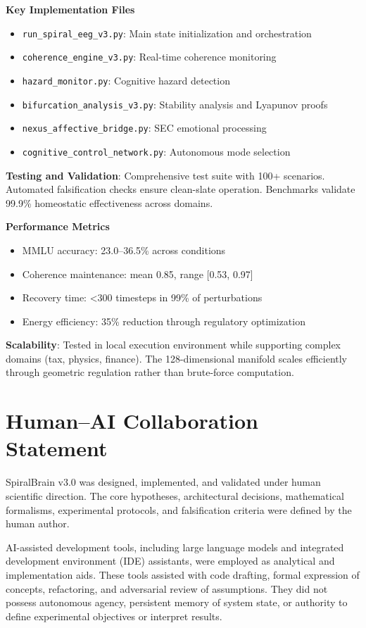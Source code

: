 \documentclass[12pt,a4paper]{report}
\begin{document}
\textbf{Key Implementation Files}

\begin{itemize}
    \item \texttt{run\_spiral\_eeg\_v3.py}: Main state initialization and orchestration
    \item \texttt{coherence\_engine\_v3.py}: Real-time coherence monitoring
    \item \texttt{hazard\_monitor.py}: Cognitive hazard detection
    \item \texttt{bifurcation\_analysis\_v3.py}: Stability analysis and Lyapunov proofs
    \item \texttt{nexus\_affective\_bridge.py}: SEC emotional processing
    \item \texttt{cognitive\_control\_network.py}: Autonomous mode selection
\end{itemize}


\textbf{Testing and Validation}: Comprehensive test suite with 100+ scenarios. Automated falsification checks ensure clean-slate operation. Benchmarks validate 99.9\% homeostatic effectiveness across domains.

\textbf{Performance Metrics}
\begin{itemize}
    \item MMLU accuracy: 23.0–36.5\% across conditions
    \item Coherence maintenance: mean 0.85, range [0.53, 0.97]
    \item Recovery time: <300 timesteps in 99\% of perturbations
    \item Energy efficiency: 35\% reduction through regulatory optimization
\end{itemize}


\textbf{Scalability}: Tested in local execution environment while supporting complex domains (tax, physics, finance). The 128-dimensional manifold scales efficiently through geometric regulation rather than brute-force computation.

\section{Human–AI Collaboration Statement}

SpiralBrain v3.0 was designed, implemented, and validated under human scientific direction. The core hypotheses, architectural decisions, mathematical formalisms, experimental protocols, and falsification criteria were defined by the human author.

AI-assisted development tools, including large language models and integrated development environment (IDE) assistants, were employed as analytical and implementation aids. These tools assisted with code drafting, formal expression of concepts, refactoring, and adversarial review of assumptions. They did not possess autonomous agency, persistent memory of system state, or authority to define experimental objectives or interpret results.
\end{document}
